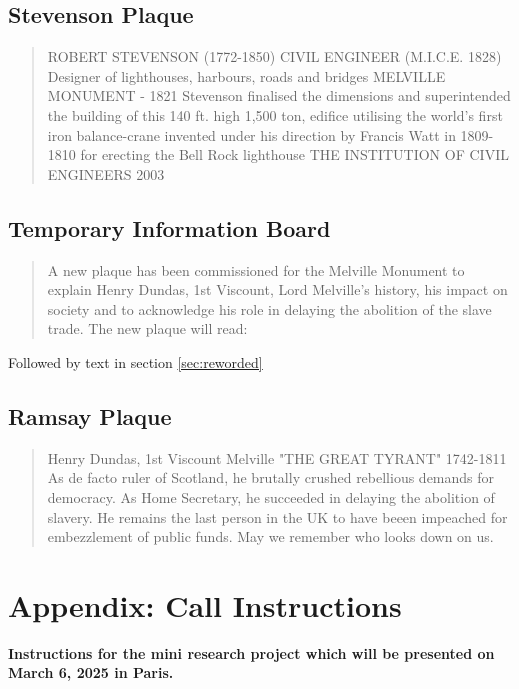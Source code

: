 \documentclass{scrartcl}
\begin{document}
\begin{appendices}
\subsection{Stevenson Plaque}\label{sec:stevenson}

\begin{quote}
ROBERT STEVENSON (1772-1850)
CIVIL ENGINEER (M.I.C.E. 1828)
Designer of lighthouses, harbours, roads and bridges
MELVILLE MONUMENT - 1821 Stevenson finalised the dimensions and superintended the building of this 140 ft. high 1,500 ton, edifice utilising the world's first iron balance-crane invented under
his direction by Francis Watt in 1809-1810 for erecting the Bell Rock lighthouse
THE INSTITUTION OF CIVIL ENGINEERS
2003
\end{quote}

\subsection{Temporary Information Board}\label{sec:temporary}


\begin{quote}
A new plaque has been commissioned for the Melville Monument to explain Henry Dundas, 1st Viscount, Lord Melville's history, his impact on society and to acknowledge his role in delaying the abolition of the slave trade.
The new plaque will read:
\end{quote}

Followed by text in section \ref{sec:reworded}

\subsection{Ramsay Plaque}

\begin{quotation}
Henry Dundas, 1st Viscount Melville
"THE GREAT TYRANT"
1742-1811
As de facto ruler of Scotland, he brutally crushed rebellious demands for democracy.
As Home Secretary, he succeeded in delaying the abolition of slavery.
He remains the last person in the UK to have beeen impeached for embezzlement of public funds.
May we remember who looks down on us.
\end{quotation}

\begin{quote}

\end{quote}

\section{Appendix: Call Instructions}
\textbf{Instructions for the mini research project which will be presented on March 6, 2025 in Paris.}


\end{appendices}
\end{document}
